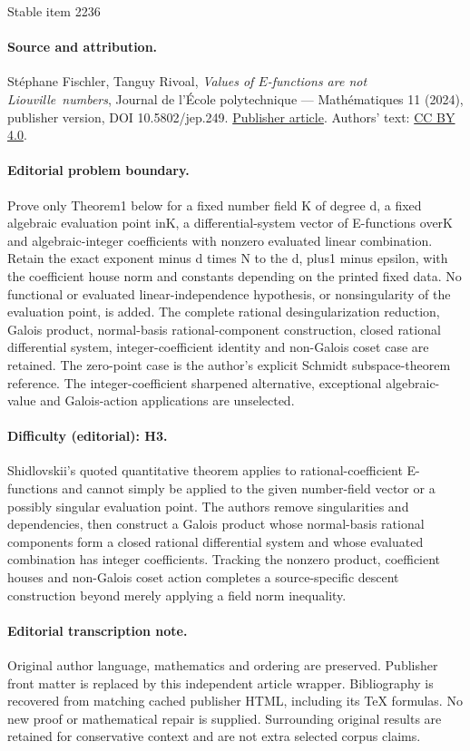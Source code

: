 \documentclass[11pt]{article}
\numberwithin{equation}{section}
\theoremstyle{definition}
\begin{document}
\begin{center}{\Large Stable item 2236}\end{center}
\paragraph{Source and attribution.}
Stéphane Fischler, Tanguy Rivoal, \emph{Values of $E$-functions are not Liouville numbers}, Journal de l’École polytechnique — Mathématiques 11 (2024), publisher version, DOI 10.5802/jep.249. \href{https://jep.centre-mersenne.org/articles/10.5802/jep.249/}{Publisher article}. Authors' text: \href{https://creativecommons.org/licenses/by/4.0/}{CC BY 4.0}.
\paragraph{Editorial problem boundary.}
Prove only Theorem1 below for a fixed number field K of degree d, a fixed algebraic evaluation point inK, a differential-system vector of E-functions overK and algebraic-integer coefficients with nonzero evaluated linear combination. Retain the exact exponent minus d times N to the d, plus1 minus epsilon, with the coefficient house norm and constants depending on the printed fixed data. No functional or evaluated linear-independence hypothesis, or nonsingularity of the evaluation point, is added. The complete rational desingularization reduction, Galois product, normal-basis rational-component construction, closed rational differential system, integer-coefficient identity and non-Galois coset case are retained. The zero-point case is the author's explicit Schmidt subspace-theorem reference. The integer-coefficient sharpened alternative, exceptional algebraic-value and Galois-action applications are unselected.
\paragraph{Difficulty (editorial): H3.}
Shidlovskii's quoted quantitative theorem applies to rational-coefficient E-functions and cannot simply be applied to the given number-field vector or a possibly singular evaluation point. The authors remove singularities and dependencies, then construct a Galois product whose normal-basis rational components form a closed rational differential system and whose evaluated combination has integer coefficients. Tracking the nonzero product, coefficient houses and non-Galois coset action completes a source-specific descent construction beyond merely applying a field norm inequality.
\paragraph{Editorial transcription note.}
Original author language, mathematics and ordering are preserved. Publisher front matter is replaced by this independent article wrapper. Bibliography is recovered from matching cached publisher HTML, including its TeX formulas. No new proof or mathematical repair is supplied. Surrounding original results are retained for conservative context and are not extra selected corpus claims.
\clearpage
\end{document}
